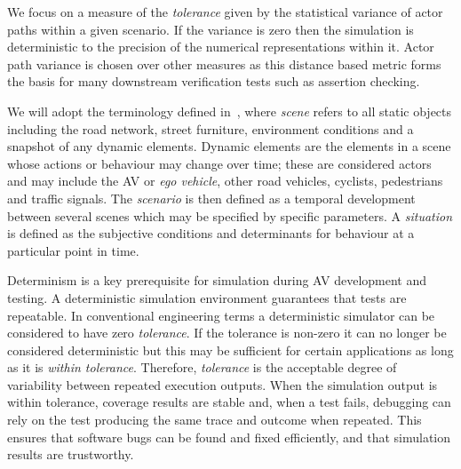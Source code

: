 \documentclass[letterpaper, 10 pt, journal, twoside]{IEEEtran}
\begin{document}
We focus on a measure of the \textit{tolerance} given by the statistical variance of actor paths within a given scenario. If the variance is zero then the simulation is deterministic to the precision of the numerical representations within it. Actor path variance is chosen over other measures as this distance based metric forms the basis for many downstream verification tests such as assertion checking. 


We will adopt the terminology defined in~\cite{Ulbrich2015}, where \textit{scene} refers to all static objects including the road network, street furniture, environment conditions and a snapshot of any dynamic elements. Dynamic elements are the elements in a scene whose actions or behaviour may change over time; these are considered actors and may include the AV or \textit{ego vehicle}, other road vehicles, cyclists, pedestrians and traffic signals. The \textit{scenario} is then defined as a temporal development between several scenes which may be specified by specific parameters. A \textit{situation} is defined as the subjective conditions and determinants for behaviour at a particular point in time.



%
Determinism is a key prerequisite for simulation during AV development and testing. A deterministic simulation environment guarantees that tests are repeatable. In conventional engineering terms a deterministic simulator can be considered to have zero \textit{tolerance}. If the tolerance is non-zero it can no longer be considered deterministic but this may be sufficient for certain applications as long as it is \textit{within tolerance}. Therefore, \textit{tolerance} is the acceptable degree of variability between repeated execution outputs. When the simulation output is within tolerance, coverage results are stable and, when a test fails, debugging can rely on the test producing the same trace and outcome when repeated. This ensures that software bugs can be found and fixed efficiently, and that simulation results are trustworthy.
\end{document}
